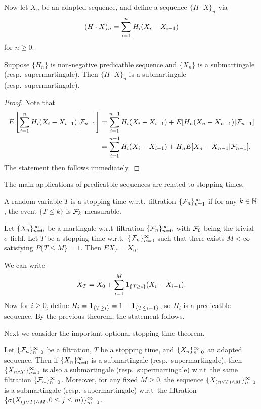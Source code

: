 \documentclass[a4paper]{article}
\begin{document}
Now let $X_n$ be an adapted sequence, and define
a sequence $\{ H \cdot X \}_n$ via
\[
  (H \cdot X)_n = \sum_{i=1}^n H_i (X_i - X_{i - 1})
\]
for $n \geq 0$.

\begin{thm}
  Suppose $\{ H_n \}$ is non-negative predicatble sequence
  and $\{ X_n \}$ is a submartingale (resp.\ supermartingale). Then
  $\{H \cdot X\}_n$ is a submartingale (resp.\ supermartingale).
\end{thm}

\begin{proof}
  Note that
  \begin{align*}
    E \left[ \sum_{i=1}^n H_i (X_i - X_{i - 1}) \middle| \mathcal{F}_{n - 1} \right]
     & = \sum_{i=1}^{n - 1} H_i (X_i - X_{i - 1})
    + E[H_n (X_n - X_{n - 1}) | \mathcal{F}_{n - 1}] \\
     & = \sum_{i=1}^{n - 1} H_i (X_i - X_{i - 1})
    + H_n E[X_n - X_{n - 1} | \mathcal{F}_{n - 1}].
  \end{align*}
  The statement then follows immediately.
\end{proof}

The main applications of predicatble sequences are related
to stopping times.

\begin{defi}
  A random variable $T$ is a stopping time w.r.t.\ filtration
  $\{ \mathcal{F}_n \}_{n=1}^\infty$ if for any $k \in \mathbb{N}$,
  the event $\{ T \leq k \}$ is $\mathcal{F}_k$-measurable.
\end{defi}

\begin{eg}
  Let $\{ X_n \}_{n=0}^\infty$ be a martingale w.r.t\
  filtration $\{ \mathcal{F}_n \}_{n=0}^\infty$ with $\mathcal{F}_0$ being the trivial
  $\sigma$-field. Let $T$ be
  a stopping time w.r.t.\ $\{ \mathcal{F}_n \}_{n=0}^\infty$
  such that there exists $M < \infty$ satisfying $P \{ T \leq M \} = 1$.
  Then $E X_T = X_0$.

  We can write
  \[
    X_T = X_0 + \sum_{i=1}^M \operatorname{\mathbf{1}}_{\{T \geq i\}} (X_i - X_{i - 1}).
  \]
  Now for $i \geq 0$,
  define $H_i = \operatorname{\mathbf{1}}_{\{T \geq i\}} = 1 - \operatorname{\mathbf{1}}_{\{T \leq i - 1\}}$,
  so $H_i$ is a predicatble sequence. By the previous theorem,
  the statement follows.
\end{eg}

Next we consider the important optional stopping time theorem.

\begin{thm}
  Let $\{ \mathcal{F}_n \}_{n=0}^\infty$ be a filtration, $T$ be a stopping time,
  and $\{ X_n \}_{n=0}^\infty$ an adapted sequence. Then
  if $\{ X_n \}_{n=0}^\infty$ is a submartingale (resp.\ supermartingale), then
  $\{ X_{n \wedge T} \}_{n=0}^\infty$ is also a submartingale (resp.\ supermartingale)
  w.r.t\ the same filtration $\{ \mathcal{F}_n \}_{n=0}^\infty$. Moreover, for any fixed
  $M \geq 0$, the sequence $\{ X_{(n \vee T) \wedge M} \}_{n=0}^\infty$
  is a submartingale (resp.\ supermartingale) w.r.t\ the filtration
  $\{ \sigma (X_{(j \vee T) \wedge M}, 0 \leq j \leq m) \}_{m=0}^\infty$.
\end{thm}
\end{document}
